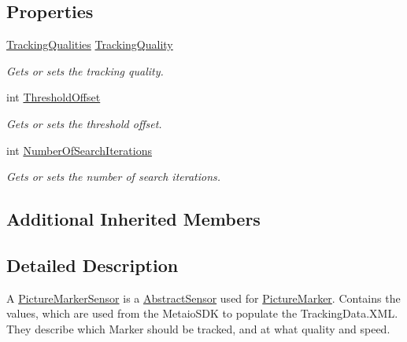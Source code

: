 \subsection*{Properties}
\begin{DoxyCompactItemize}
\item 
\hyperlink{class_a_rdev_kit_1_1_model_1_1_project_1_1_picture_marker_sensor_aff811596849fce290f77dea5f63b16c6}{Tracking\-Qualities} \hyperlink{class_a_rdev_kit_1_1_model_1_1_project_1_1_picture_marker_sensor_a312b8ea728d3018c96cb50ceb5c59f0c}{Tracking\-Quality}
\begin{DoxyCompactList}\small\item\em Gets or sets the tracking quality. \end{DoxyCompactList}\item 
int \hyperlink{class_a_rdev_kit_1_1_model_1_1_project_1_1_picture_marker_sensor_a423bb9bb3fb7916fc9705640f58522e6}{Threshold\-Offset}
\begin{DoxyCompactList}\small\item\em Gets or sets the threshold offset. \end{DoxyCompactList}\item 
int \hyperlink{class_a_rdev_kit_1_1_model_1_1_project_1_1_picture_marker_sensor_abdebe622c6ef02494e50d0caa2b142cb}{Number\-Of\-Search\-Iterations}
\begin{DoxyCompactList}\small\item\em Gets or sets the number of search iterations. \end{DoxyCompactList}\end{DoxyCompactItemize}
\subsection*{Additional Inherited Members}


\subsection{Detailed Description}
A \hyperlink{class_a_rdev_kit_1_1_model_1_1_project_1_1_picture_marker_sensor}{Picture\-Marker\-Sensor} is a \hyperlink{class_a_rdev_kit_1_1_model_1_1_project_1_1_abstract_sensor}{Abstract\-Sensor} used for \hyperlink{class_a_rdev_kit_1_1_model_1_1_project_1_1_picture_marker}{Picture\-Marker}. Contains the values, which are used from the Metaio\-S\-D\-K to populate the Tracking\-Data.\-X\-M\-L. They describe which Marker should be tracked, and at what quality and speed. 



